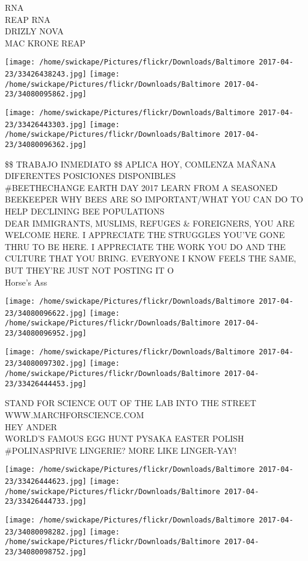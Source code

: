 \documentclass[10pt,letterpaper]{article}
\begin{document}
RNA\\
REAP RNA\\
DRIZLY NOVA\\
MAC KRONE REAP
\pagebreak

\texttt{[image: /home/swickape/Pictures/flickr/Downloads/Baltimore 2017-04-23/33426438243.jpg]}
\texttt{[image: /home/swickape/Pictures/flickr/Downloads/Baltimore 2017-04-23/34080095862.jpg]}

\texttt{[image: /home/swickape/Pictures/flickr/Downloads/Baltimore 2017-04-23/33426443303.jpg]}
\texttt{[image: /home/swickape/Pictures/flickr/Downloads/Baltimore 2017-04-23/34080096362.jpg]}

\$\$ TRABAJO INMEDIATO \$\$ APLICA HOY, COMLENZA MAÑANA DIFERENTES POSICIONES DISPONIBLES\\
\#BEETHECHANGE EARTH DAY 2017 LEARN FROM A SEASONED BEEKEEPER WHY BEES ARE SO IMPORTANT/WHAT YOU CAN DO TO HELP DECLINING BEE POPULATIONS\\
DEAR IMMIGRANTS, MUSLIMS, REFUGES \& FOREIGNERS, YOU ARE WELCOME HERE.  I APPRECIATE THE STRUGGLES YOU'VE GONE THRU TO BE HERE.  I APPRECIATE THE WORK YOU DO AND THE CULTURE THAT YOU BRING.  EVERYONE I KNOW FEELS THE SAME, BUT THEY'RE JUST NOT POSTING IT O\\
Horse's Ass
\pagebreak

\texttt{[image: /home/swickape/Pictures/flickr/Downloads/Baltimore 2017-04-23/34080096622.jpg]}
\texttt{[image: /home/swickape/Pictures/flickr/Downloads/Baltimore 2017-04-23/34080096952.jpg]}

\texttt{[image: /home/swickape/Pictures/flickr/Downloads/Baltimore 2017-04-23/34080097302.jpg]}
\texttt{[image: /home/swickape/Pictures/flickr/Downloads/Baltimore 2017-04-23/33426444453.jpg]}

STAND FOR SCIENCE OUT OF THE LAB INTO THE STREET WWW.MARCHFORSCIENCE.COM\\
HEY ANDER\\
WORLD'S FAMOUS EGG HUNT PYSAKA EASTER POLISH\\
\#POLINASPRIVE LINGERIE? MORE LIKE LINGER{-}YAY!
\pagebreak

\texttt{[image: /home/swickape/Pictures/flickr/Downloads/Baltimore 2017-04-23/33426444623.jpg]}
\texttt{[image: /home/swickape/Pictures/flickr/Downloads/Baltimore 2017-04-23/33426444733.jpg]}

\texttt{[image: /home/swickape/Pictures/flickr/Downloads/Baltimore 2017-04-23/34080098282.jpg]}
\texttt{[image: /home/swickape/Pictures/flickr/Downloads/Baltimore 2017-04-23/34080098752.jpg]}
\end{document}

